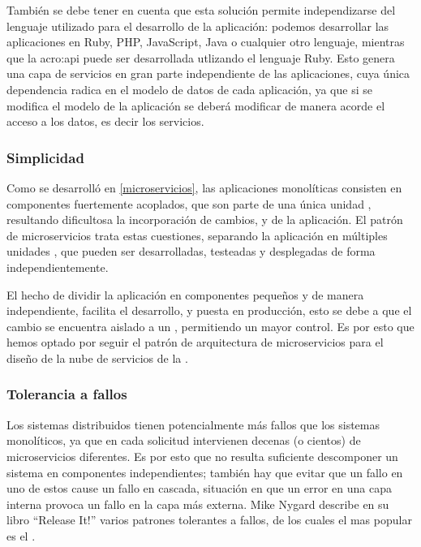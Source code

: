 También se debe tener en cuenta que esta solución permite independizarse del lenguaje utilizado para el desarrollo de la aplicación: podemos desarrollar las aplicaciones en Ruby, PHP, JavaScript, Java o cualquier otro lenguaje, mientras que la \gls{acro:api} puede ser desarrollada utlizando el lenguaje Ruby. Esto genera una capa de servicios en gran parte independiente de las aplicaciones, cuya única dependencia radica en el modelo de datos de cada aplicación, ya que si se modifica el modelo de la aplicación se deberá modificar de manera acorde el acceso a los datos, es decir los servicios.


\subsubsection{Simplicidad}

Como se desarrolló en \autoref{microservicios}, las aplicaciones monolíticas consisten en componentes fuertemente acoplados, que son parte de una única unidad , resultando dificultosa la incorporación de cambios,  y  de la aplicación.  El patrón de microservicios trata estas cuestiones, separando la aplicación en múltiples unidades , que pueden ser desarrolladas, testeadas y desplegadas de forma independientemente.

El hecho de dividir la aplicación en componentes pequeños y  de manera independiente, facilita el desarrollo,  y puesta en producción, esto se debe a que el cambio se encuentra aislado a un , permitiendo un mayor control.  Es por esto que hemos optado por seguir el patrón de arquitectura de microservicios para el diseño de la nube de servicios de la {\unlp}.

\subsubsection{Tolerancia a fallos}

Los sistemas distribuidos tienen potencialmente más fallos que los sistemas monolíticos, ya que en cada solicitud intervienen decenas (o cientos) de microservicios diferentes\cite[p.~48]{stin2015}. Es por esto que no resulta suficiente descomponer un sistema en componentes independientes; también hay que evitar que un fallo en uno de estos cause un fallo en cascada\cite[p.~4]{stin2015}, situación en que un error en una capa interna provoca un fallo en la capa más externa\cite[p.~65]{nygard2007}. Mike Nygard describe en su libro ``Release It!''\cite{nygard2007} varios patrones tolerantes a fallos, de los cuales el mas popular es el .

